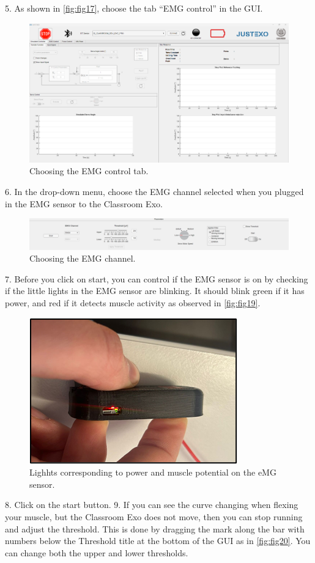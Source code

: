 5.	As shown in \autoref{fig:fig17}, choose the tab “EMG control” in the GUI. 

\begin{figure}[H]
	\centering
	\includegraphics[width=0.7\linewidth]{img/fig_17}
	\caption{Choosing the EMG control tab.}
	\label{fig:fig17}
\end{figure}


6.	In the drop-down menu, choose the EMG channel selected when you plugged in the EMG sensor to the Classroom Exo.  
\begin{figure}[H]
	\centering
	\includegraphics[width=1\linewidth]{img/fig_18}
	\caption{Choosing the EMG channel.}
	\label{fig:fig18}
\end{figure}




7.	Before you click on start, you can control if the EMG sensor is on by checking if the little lights in the EMG sensor are blinking. It should blink green if it has power, and red if it detects muscle activity as observed in \autoref{fig:fig19}. 

\begin{figure}[H]
	\centering
	\includegraphics[width=0.4\linewidth]{img/fig_19}
	\caption{Lighhts corresponding to power and muscle potential on the eMG sensor.}
	\label{fig:fig19}
\end{figure}

8.	Click on the start button. 
9.	If you can see the curve changing when flexing your muscle, but the Classroom Exo does not move, then you can stop running and adjust the threshold. This is done by dragging the mark along the bar with numbers below the Threshold title at the bottom of the GUI as in \autoref{fig:fig20}. You can change both the upper and lower thresholds. 


